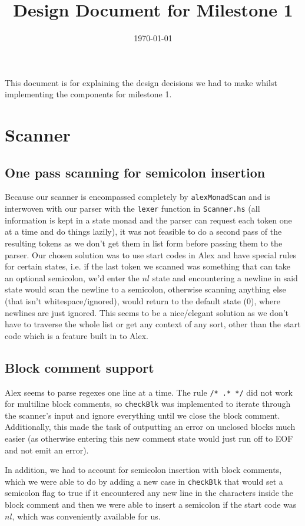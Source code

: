 \documentclass[11pt]{article}
\date{\today}
\title{Design Document for Milestone 1}
\begin{document}
\maketitle
\tableofcontents

This document is for explaining the design decisions we had to make
whilst implementing the components for milestone 1.
\section{Scanner}
\label{sec:org33fc9de}
\subsection{One pass scanning for semicolon insertion}
\label{sec:orgc5764a2}
Because our scanner is encompassed completely by \texttt{alexMonadScan}
and is interwoven with our parser with the \texttt{lexer} function in
\texttt{Scanner.hs} (all information is kept in a state monad and the
parser can request each token one at a time and do things lazily),
it was not feasible to do a second pass of the resulting tokens as
we don't get them in list form before passing them to the
parser. Our chosen solution was to use start codes in Alex and have
special rules for certain states, i.e. if the last token we scanned
was something that can take an optional semicolon, we'd enter the
\(nl\) state and encountering a newline in said state would scan the
newline to a semicolon, otherwise scanning anything else (that
isn't whitespace/ignored), would return to the default state (\(0\)),
where newlines are just ignored. This seems to be a nice/elegant
solution as we don't have to traverse the whole list or get any
context of any sort, other than the start code which is a feature
built in to Alex.
\subsection{Block comment support}
\label{sec:orgafbb635}
Alex seems to parse regexes one line at a time. The rule \texttt{/* .* */}
did not work for multiline block comments, so \texttt{checkBlk} was
implemented to iterate through the scanner's input and ignore
everything until we close the block comment. Additionally, this
made the task of outputting an error on unclosed blocks much easier
(as otherwise entering this new comment state would just run off to
EOF and not emit an error).

In addition, we had to account for semicolon insertion with block
comments, which we were able to do by adding a new case in
\texttt{checkBlk} that would set a semicolon flag to true if it
encountered any new line in the characters inside the block comment
and then we were able to insert a semicolon if the start code was
\(nl\), which was conveniently available for us.
\end{document}
